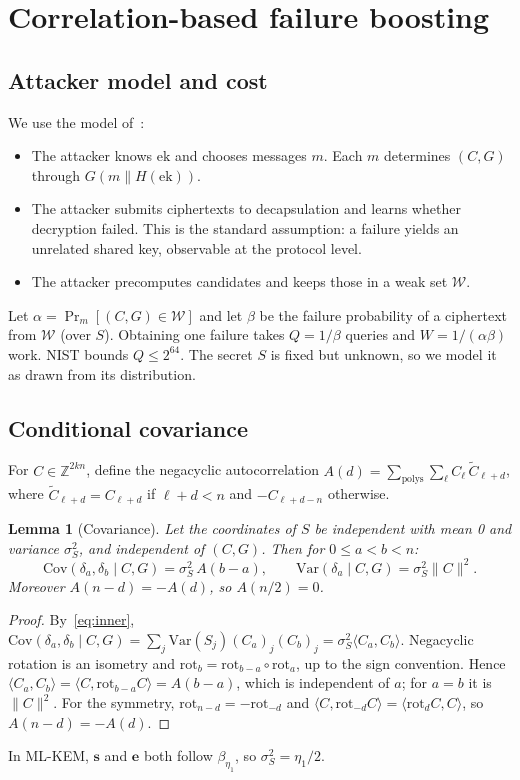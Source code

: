 \documentclass[11pt,a4paper]{article}
\newtheorem{lemma}[theorem]{Lemma}
\theoremstyle{definition}
\theoremstyle{remark}
\newcommand{\Z}{\mathbb{Z}}
\newcommand{\Var}{\mathrm{Var}}
\newcommand{\Cov}{\mathrm{Cov}}
\newcommand{\rot}{\mathrm{rot}}
\newcommand{\Anc}{A}
\begin{document}
\section{Correlation-based failure boosting}\label{sec:attack}

\subsection{Attacker model and cost}
We use the model of~\cite{danvers19}:
\begin{itemize}[leftmargin=*,itemsep=1pt]
\item The attacker knows $\mathrm{ek}$ and chooses messages $m$. Each $m$ determines $(C,G)$ through $G(m\|H(\mathrm{ek}))$.
\item The attacker submits ciphertexts to decapsulation and learns whether decryption failed. This is the standard assumption: a failure yields an unrelated shared key, observable at the protocol level.
\item The attacker precomputes candidates and keeps those in a weak set $\mathcal W$.
\end{itemize}
Let $\alpha=\Pr_m[(C,G)\in\mathcal W]$ and let $\beta$ be the failure probability of a ciphertext from $\mathcal W$ (over $S$). Obtaining one failure takes $Q=1/\beta$ queries and $W=1/(\alpha\beta)$ work. NIST bounds $Q\le2^{64}$. The secret $S$ is fixed but unknown, so we model it as drawn from its distribution.

\subsection{Conditional covariance}
For $C\in\Z^{2kn}$, define the negacyclic autocorrelation $\Anc(d)=\sum_{\text{polys}}\sum_{\ell}C_\ell\,\tilde C_{\ell+d}$, where $\tilde C_{\ell+d}=C_{\ell+d}$ if $\ell+d<n$ and $-C_{\ell+d-n}$ otherwise.

\begin{lemma}[Covariance]\label{lem:cov}
Let the coordinates of $S$ be independent with mean 0 and variance $\sigma_S^2$, and independent of $(C,G)$. Then for $0\le a<b<n$:
\[ \Cov(\delta_a,\delta_b\mid C,G)=\sigma_S^2\,\Anc(b-a),\qquad \Var(\delta_a\mid C,G)=\sigma_S^2\|C\|^2. \]
Moreover $\Anc(n-d)=-\Anc(d)$, so $\Anc(n/2)=0$.
\end{lemma}
\begin{proof}
By~\eqref{eq:inner}, $\Cov(\delta_a,\delta_b\mid C,G)=\sum_j\Var(S_j)(C_a)_j(C_b)_j=\sigma_S^2\langle C_a,C_b\rangle$. Negacyclic rotation is an isometry and $\rot_b=\rot_{b-a}\circ\rot_a$, up to the sign convention. Hence $\langle C_a,C_b\rangle=\langle C,\rot_{b-a}C\rangle=\Anc(b-a)$, which is independent of $a$; for $a=b$ it is $\|C\|^2$. For the symmetry, $\rot_{n-d}=-\rot_{-d}$ and $\langle C,\rot_{-d}C\rangle=\langle\rot_dC,C\rangle$, so $\Anc(n-d)=-\Anc(d)$.
\end{proof}
In ML-KEM, $\mathbf s$ and $\mathbf e$ both follow $\beta_{\eta_1}$, so $\sigma_S^2=\eta_1/2$.
\end{document}
